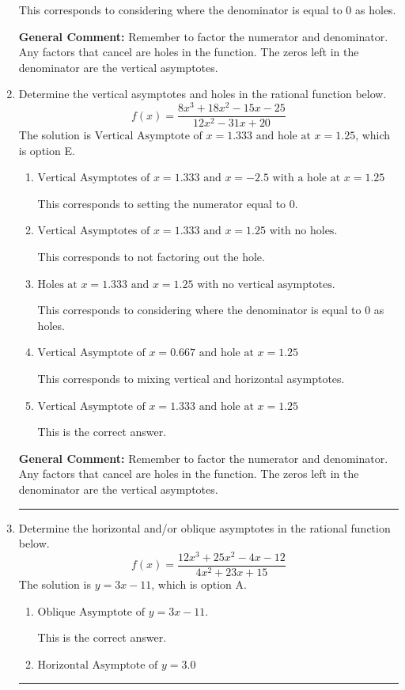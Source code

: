 \documentclass{extbook}[14pt]
\newcommand{\litem}[1]{\item #1

\rule{\textwidth}{0.4pt}}
\begin{document}
\begin{enumerate}
{\begin{enumerate}[label=\Alph*.]
This corresponds to considering where the denominator is equal to 0 as holes.
\end{enumerate}

\textbf{General Comment:} Remember to factor the numerator and denominator. Any factors that cancel are holes in the function. The zeros left in the denominator are the vertical asymptotes.
}
\litem{
Determine the vertical asymptotes and holes in the rational function below.
\[ f(x) = \frac{8x^{3} +18 x^{2} -15 x -25}{12x^{2} -31 x + 20} \]The solution is \( \text{Vertical Asymptote of } x = 1.333 \text{ and hole at } x = 1.25 \), which is option E.\begin{enumerate}[label=\Alph*.]
\item \( \text{Vertical Asymptotes of } x = 1.333 \text{ and } x = -2.5 \text{ with a hole at } x = 1.25 \)

This corresponds to setting the numerator equal to 0.
\item \( \text{Vertical Asymptotes of } x = 1.333 \text{ and } x = 1.25 \text{ with no holes.} \)

This corresponds to not factoring out the hole.
\item \( \text{Holes at } x = 1.333 \text{ and } x = 1.25 \text{ with no vertical asymptotes.} \)

This corresponds to considering where the denominator is equal to 0 as holes.
\item \( \text{Vertical Asymptote of } x = 0.667 \text{ and hole at } x = 1.25 \)

This corresponds to mixing vertical and horizontal asymptotes.
\item \( \text{Vertical Asymptote of } x = 1.333 \text{ and hole at } x = 1.25 \)

This is the correct answer.
\end{enumerate}

\textbf{General Comment:} Remember to factor the numerator and denominator. Any factors that cancel are holes in the function. The zeros left in the denominator are the vertical asymptotes.
}
\litem{
Determine the horizontal and/or oblique asymptotes in the rational function below.
\[ f(x) = \frac{12x^{3} +25 x^{2} -4 x -12}{4x^{2} +23 x + 15} \]The solution is \( y = 3x -11 \), which is option A.\begin{enumerate}[label=\Alph*.]
\item \( \text{Oblique Asymptote of } y = 3x -11. \)

This is the correct answer.
\item \( \text{Horizontal Asymptote of } y = 3.0  \)


\end{enumerate}}
\end{enumerate}
\end{document}
